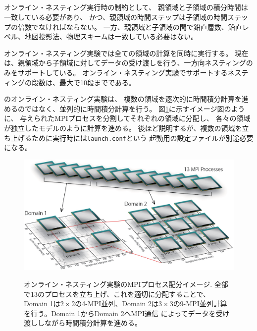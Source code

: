 \subsection{\SubsecOnlineNesting} \label{subsec:nest_online}

オンライン・ネスティング実行時の制約として、
親領域と子領域の積分時間は一致している必要があり、
かつ、親領域の時間ステップは子領域の時間ステップの倍数でなければならない。
一方、親領域と子領域の間で鉛直層数、鉛直レベル、地図投影法、物理スキームは一致している必要はない。

オンライン・ネスティング実験では全ての領域の計算を同時に実行する。
現在は、親領域から子領域に対してデータの受け渡しを行う、一方向ネスティングのみをサポートしている。
オンライン・ネスティング実験でサポートするネスティングの段数は、最大で10段までである。

\scalerm のオンライン・ネスティング実験は、
複数の領域を逐次的に時間積分計算を進めるのではなく、並列的に時間積分計算を行う。
図\ref{fig_mpisplit}に示すイメージ図のように、
与えられたMPIプロセスを分割してそれぞれの領域に分配し、
各々の領域が独立したモデルのように計算を進める。
後ほど説明するが、複数の領域を立ち上げるために実行時には\verb|launch.conf|という
起動用の設定ファイルが別途必要になる。

\begin{figure}[ht]
\begin{center}
  \includegraphics[width=0.8\hsize]{./figure/mpisplit_nesting.eps}\\
  \caption{オンライン・ネスティング実験のMPIプロセス配分イメージ. 全部で13のプロセスを立ち上げ、これを適切に分配することで、
           Domain 1は$2 \times 2$の4-MPI並列、Domain 2は$3 \times 3$の9-MPI並列計算を行う。Domain 1からDomain 2へMPI通信
           によってデータを受け渡ししながら時間積分計算を進める。}
  \label{fig_mpisplit}
\end{center}
\end{figure}


